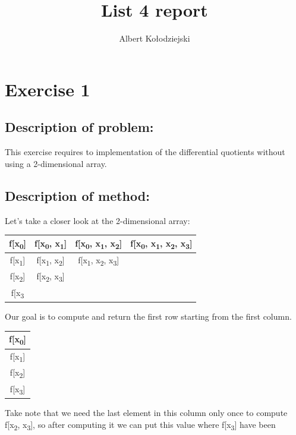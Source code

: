 \documentclass{article}
\title{List 4 report}
\author{Albert Kołodziejski}
\begin{document}
\maketitle

\section*{Exercise 1}

\subsection*{Description of problem:}
This exercise requires to implementation of the differential quotients without using a 2-dimensional array.

\subsection*{Description of method:}
Let's take a closer look at the 2-dimensional array:

\begin{center}
    \begin{tabular}{| c | c | c | c |}
        \hline
        f[x\textsubscript{0}] & f[x\textsubscript{0}, x\textsubscript{1}] & f[x\textsubscript{0}, x\textsubscript{1}, x\textsubscript{2}] & f[x\textsubscript{0}, x\textsubscript{1}, x\textsubscript{2}, x\textsubscript{3}] \\ 
        \hline
        f[x\textsubscript{1}] & f[x\textsubscript{1}, x\textsubscript{2}] & f[x\textsubscript{1}, x\textsubscript{2}, x\textsubscript{3}] \\ 
        \cline{1-3}
        f[x\textsubscript{2}] & f[x\textsubscript{2}, x\textsubscript{3}] \\
        \cline{1-2}
        f[x\textsubscript{3} \\ 
        \cline{1-1}
    \end{tabular}
\end{center}
Our goal is to compute and return the first row starting from the first column. 

\begin{center}
    \begin{tabular}{| c |}
        \hline
        f[x\textsubscript{0}]\\ 
        \hline
        f[x\textsubscript{1}]\\
        \hline
        f[x\textsubscript{2}]\\
        \hline
        f[x\textsubscript{3}]\\ 
        \hline
    \end{tabular}
\end{center}
Take note that we need the last element in this column only once to compute f[x\textsubscript{2}, x\textsubscript{3}], so after computing it we can put this value where f[x\textsubscript{3}] have been
\end{document}
